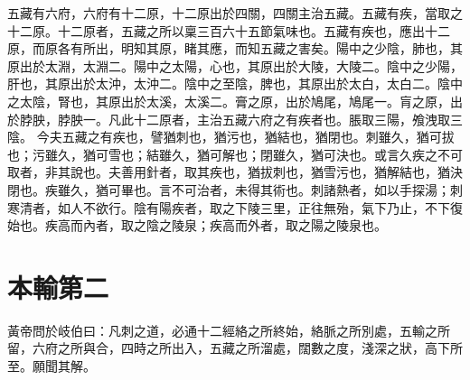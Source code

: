 五藏有六府，六府有十二原，十二原出於四關，四關主治五藏。五藏有疾，當取之十二原。十二原者，五藏之所以稟三百六十五節氣味也。五藏有疾也，應出十二原，而原各有所出，明知其原，睹其應，而知五藏之害矣。陽中之少陰，肺也，其原出於太淵，太淵二。陽中之太陽，心也，其原出於大陵，大陵二。陰中之少陽，肝也，其原出於太沖，太沖二。陰中之至陰，脾也，其原出於太白，太白二。陰中之太陰，腎也，其原出於太溪，太溪二。膏之原，出於鳩尾，鳩尾一。肓之原，出於脖胦，脖胦一。凡此十二原者，主治五藏六府之有疾者也。脹取三陽，飧洩取三陰。
今夫五藏之有疾也，譬猶刺也，猶污也，猶結也，猶閉也。刺雖久，猶可拔也；污雖久，猶可雪也；結雖久，猶可解也；閉雖久，猶可決也。或言久疾之不可取者，非其說也。夫善用針者，取其疾也，猶拔刺也，猶雪污也，猶解結也，猶決閉也。疾雖久，猶可畢也。言不可治者，未得其術也。刺諸熱者，如以手探湯；刺寒清者，如人不欲行。陰有陽疾者，取之下陵三里，正往無殆，氣下乃止，不下復始也。疾高而內者，取之陰之陵泉；疾高而外者，取之陽之陵泉也。



\section{本輸第二}

黃帝問於岐伯曰：凡刺之道，必通十二經絡之所終始，絡脈之所別處，五輸之所留，六府之所與合，四時之所出入，五藏之所溜處，闊數之度，淺深之狀，高下所至。願聞其解。

